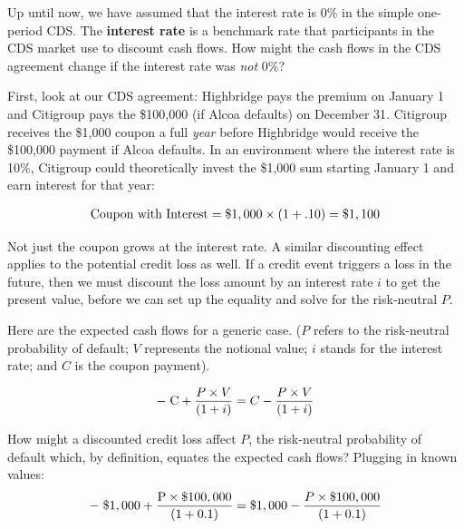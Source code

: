\documentclass{jss}
\begin{document}
Up until now, we have assumed that the interest rate is 0\% in the simple one-period CDS. The \textbf{interest rate} is a benchmark rate that participants in the CDS market use to discount cash flows. How might the cash flows in the CDS agreement change if the interest rate was \emph{not} 0\%?

First, look at our CDS agreement: Highbridge pays the premium on January 1 and Citigroup pays the \$100,000 (if Alcoa defaults) on December 31. Citigroup receives the \$1,000 coupon a full \emph{year} before Highbridge would receive the \$100,000 payment if Alcoa defaults. In an environment where the interest rate is 10\%, Citigroup could theoretically invest the \$1,000 sum starting January 1 and earn interest for that year:

\begin{equation}
 \begin{aligned}
  {\rm Coupon\hspace{3pt}with\hspace{3pt}Interest = {\$1,000}\times{(1 + .10)} = \$1,100} 
    \end{aligned}
\end{equation}

Not just the coupon grows at the interest rate. A similar discounting effect applies to the potential credit loss as well. If a credit event triggers a loss in the future, then we must discount the loss amount by an interest rate $i$ to get the present value, before we can set up the equality and solve for the risk-neutral $P$.

Here are the expected cash flows for a generic case. ($P$ refers to the risk-neutral probability of default; $V$ represents the notional value; $i$ stands for the interest rate; and $C$ is the coupon payment).

\begin{equation}
 \begin{aligned}
  {\rm -\hspace{3pt}C} + \frac{P \times V}{(1 + i)} = C - \frac{P \times V}{(1 + i)} 
    \end{aligned}
\label{eqn:InterestRate}
\end{equation}

How might a discounted credit loss affect $P$, the risk-neutral probability of default which, by definition, equates the expected cash flows? Plugging in known values:
\begin{equation}
 \begin{aligned}
  {\rm -\hspace{3pt}\$1,000 + \frac{P \times \$100,000}{(1 + 0.1)} = \$1,000} - \frac{P \times \$100,000}{(1 + 0.1)} 
    \end{aligned}
\end{equation}
\end{document}
